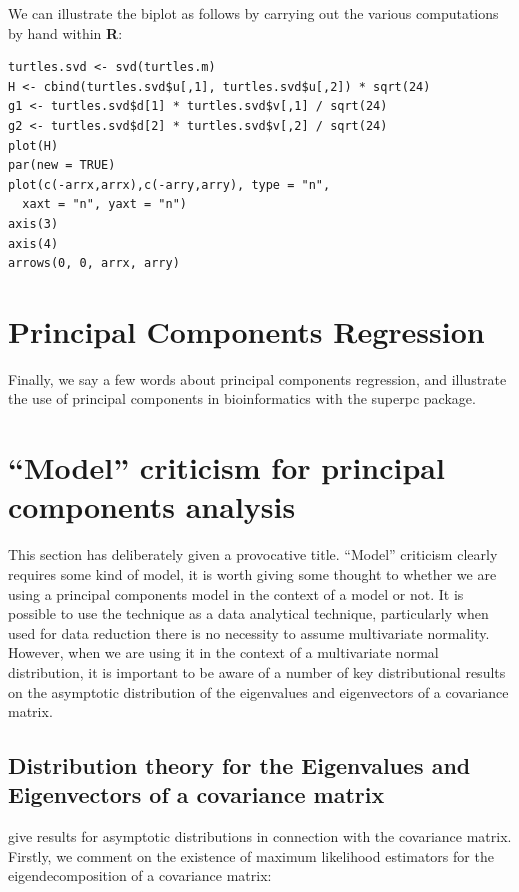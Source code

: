 We can illustrate the biplot as follows by carrying out the various computations by hand within \textbf{R}:

\singlespacing
\begin{verbatim}
turtles.svd <- svd(turtles.m)
H <- cbind(turtles.svd$u[,1], turtles.svd$u[,2]) * sqrt(24)
g1 <- turtles.svd$d[1] * turtles.svd$v[,1] / sqrt(24)
g2 <- turtles.svd$d[2] * turtles.svd$v[,2] / sqrt(24)
plot(H)
par(new = TRUE)
plot(c(-arrx,arrx),c(-arry,arry), type = "n",
  xaxt = "n", yaxt = "n")
axis(3)
axis(4)
arrows(0, 0, arrx, arry)
\end{verbatim}
\onehalfspacing


\section{Principal Components Regression}

Finally, we say a few words about principal components regression, and illustrate the use of principal components in bioinformatics with the superpc package.


\section{``Model'' criticism for principal components analysis}

This section has deliberately given a provocative title.   ``Model'' criticism clearly requires some kind of model, it is worth giving some thought to whether we are using a principal components model in the context of a model or not.   It is possible to use the technique as a data analytical technique, particularly when used for data reduction there is no necessity to assume multivariate normality.   However, when we are using it in the context of a multivariate normal distribution, it is important to be aware of a number of key distributional results on the asymptotic distribution of the eigenvalues and eigenvectors of a covariance matrix.


\subsection{Distribution theory for the Eigenvalues and Eigenvectors of a covariance matrix}

\cite{Girshink:1939,Anderson:1963} give results for asymptotic distributions in connection with the covariance matrix.   Firstly, we comment on the existence of maximum likelihood estimators for the eigendecomposition of a covariance matrix:

